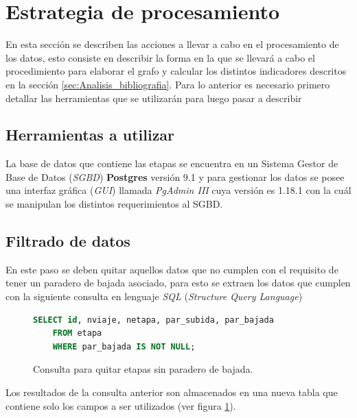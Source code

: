 \documentclass[12pt]{article}
\begin{document}
    \newpage
    \section{Estrategia de procesamiento}
  
	En esta sección se describen las acciones a llevar a cabo en el procesamiento de los datos, esto consiste en describir la forma en la que se llevará a cabo el procedimiento para elaborar el grafo y calcular los distintos indicadores descritos en la sección \ref{sec:Analisis_bibliografia}. Para lo anterior es necesario primero detallar las herramientas que se utilizarán para luego pasar a describir 

	\subsection{Herramientas a utilizar}
	
	La base de datos que contiene las etapas se encuentra en un Sistema Gestor de Base de Datos (\textit{SGBD}) \textbf{Postgres} versión 9.1 y para gestionar los datos se posee una interfaz gráfica (\textit{GUI}) llamada \textit{PgAdmin III} cuya versión es 1.18.1 con la cuál se manipulan los distintos requerimientos al SGBD. 
	
	\subsection{Filtrado de datos}
	
	En este paso se deben quitar aquellos datos que no cumplen con el requisito de tener un paradero de bajada asociado, para esto se extraen los datos que cumplen con la siguiente consulta en lenguaje \textit{SQL} (\textit{Structure Query Language})
	
\begin{figure}[h]
\begin{center}
\begin{lstlisting}[breaklines=true, language=SQL]
	SELECT id, nviaje, netapa, par_subida, par_bajada 
	FROM etapa 
	WHERE par_bajada IS NOT NULL;
\end{lstlisting}
\end{center}
\caption{Consulta para quitar etapas sin paradero de bajada.}
\label{fig:limpiar_datos}
\end{figure}
	
	Los resultados de la consulta anterior son almacenados en una nueva tabla que contiene solo los campos a ser utilizados (ver figura \ref{fig:limpiar_datos}).
	
\end{document}
